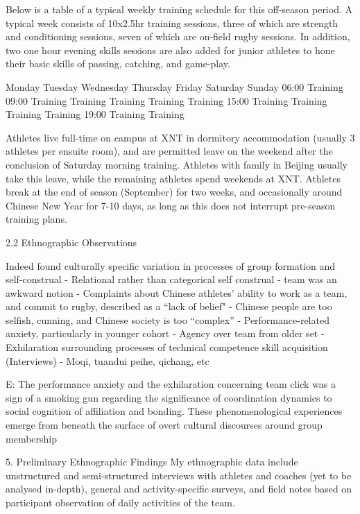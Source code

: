 \documentclass[12pt]{report}
\begin{document}
Below is a table of a typical weekly training schedule for this off-season period. A typical week consists of 10x2.5hr training sessions, three of which are strength and conditioning sessions, seven of which are on-field rugby sessions.  In addition, two one hour evening skills sessions are also added for junior athletes to hone their basic skills of passing, catching, and game-play.

	Monday	Tuesday	Wednesday	Thursday	Friday	Saturday	Sunday
06:00	Training
09:00		Training	Training	Training	Training	Training
15:00	Training	Training		Training	Training
19:00		Training		Training

Athletes live full-time on campus at XNT in dormitory accommodation (usually 3 athletes per ensuite room), and are permitted leave on the weekend after the conclusion of Saturday morning training.  Athletes with family in Beijing usually take this leave, while the remaining athletes spend weekends at XNT.  Athletes break at the end of season (September) for two weeks, and occasionally around Chinese New Year for 7-10 days, as long as this does not interrupt pre-season training plans.



2.2 Ethnographic Observations

		Indeed found culturally specific variation in processes of group formation and self-construal
			- Relational rather than categorical self construal - team was an awkward notion
			- Complaints about Chinese athletes' ability to work as a team, and commit to rugby, described as a ``lack of belief"
					- Chinese people are too selfish, cunning, and Chinese society is too ``complex''
					- Performance-related anxiety, particularly in younger cohort
					- Agency over team from older set
					- Exhilaration surrounding processes of technical competence skill acquisition (Interviews)
					- Moqi, tuandui peihe, qichang, etc

			E: The performance anxiety and the exhilaration concerning team click was a sign of a smoking gun regarding the significance of coordination dynamics to social cognition of affiliation and bonding.  These phenomenological experiences emerge from beneath the surface of overt cultural discourses around group membership




5.	Preliminary Ethnographic Findings
My ethnographic data include unstructured and semi-structured interviews with athletes and coaches (yet to be analysed in-depth), general and activity-specific surveys, and field notes based on participant observation of daily activities of the team.
\end{document}
